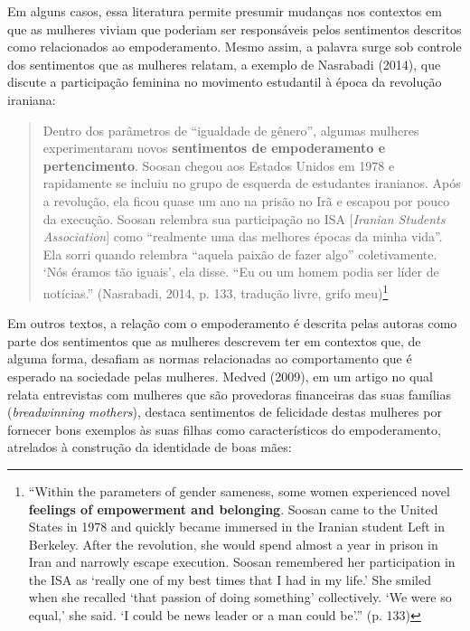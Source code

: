 Em alguns casos, essa literatura permite presumir mudanças nos contextos em que as mulheres viviam que poderiam ser responsáveis pelos sentimentos descritos como relacionados ao empoderamento. Mesmo assim, a palavra surge sob controle dos sentimentos que as mulheres relatam, a exemplo de Nasrabadi (2014), que discute a participação feminina no movimento estudantil à época da revolução iraniana:

\begin{quote}
    Dentro dos parâmetros de ``igualdade de gênero'', algumas mulheres experimentaram novos \textbf{sentimentos de empoderamento e pertencimento}. Soosan chegou aos Estados Unidos em 1978 e rapidamente se incluiu no grupo de esquerda de estudantes iranianos. Após a revolução, ela ficou quase um ano na prisão no Irã e escapou por pouco da execução. Soosan relembra sua participação no ISA [\textit{Iranian Students Association}] como ``realmente uma das melhores épocas da minha vida''. Ela sorri quando relembra ``aquela paixão de fazer algo'' coletivamente. ‘Nós éramos tão iguais’, ela disse. ``Eu ou um homem podia ser líder de notícias.'' (Nasrabadi, 2014, p. 133, tradução livre, grifo meu)\footnote{``Within the parameters of gender sameness, some women experienced novel \textbf{feelings of empowerment and belonging}. Soosan came to the United States in 1978 and quickly became immersed in the Iranian student Left in Berkeley. After the revolution, she would spend almost a year in prison in Iran and narrowly escape execution. Soosan remembered her participation in the ISA as ‘really one of my best times that I had in my life.’ She smiled when she recalled ‘that passion of doing something’ collectively. ‘We were so equal,’ she said. ‘I could be news leader or a man could be’.'' (p. 133)}
\end{quote}

Em outros textos, a relação com o empoderamento é descrita pelas autoras como parte dos sentimentos que as mulheres descrevem ter em contextos que, de alguma forma, desafiam as normas relacionadas ao comportamento que é esperado na sociedade pelas mulheres. Medved (2009), em um artigo no qual relata entrevistas com mulheres que são provedoras financeiras das suas famílias (\textit{breadwinning mothers}), destaca sentimentos de felicidade destas mulheres por fornecer bons exemplos às suas filhas como característicos do empoderamento, atrelados à construção da identidade de boas mães:

